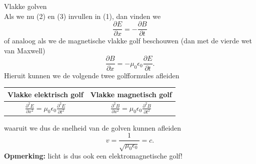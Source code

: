 \begin{app}{Vlakke golven}
\begin{equation}
    \end{equation}
    Als we nu (2) en (3) invullen in (1), dan vinden we
    \begin{equation*}
        \frac{\partial E}{\partial x} = - \frac{\partial B}{\partial t}
    \end{equation*}
    of analoog als we de magnetische vlakke golf beschouwen (dan met de vierde wet van Maxwell)
    \begin{equation*}
        \frac{\partial B}{\partial x} = - \mu_0\epsilon_0 \frac{\partial E}{\partial t}.
    \end{equation*}
    Hieruit kunnen we de volgende twee golfformules afleiden
    \begin{center}
        \def\arraystretch{2}
        \begin{tabular}{c|c}
            Vlakke elektrisch golf & Vlakke magnetisch golf \\ \hline
            $\frac{\partial^2 E}{\partial x^2} = \mu_0\epsilon_0 \frac{\partial^2 E}{\partial t^2} $ & $\frac{\partial^2 B}{\partial x^2} = \mu_0\epsilon_0 \frac{\partial^2 B}{\partial t^2}$ 
        \end{tabular}
    \end{center}
    waaruit we dus de snelheid van de golven kunnen afleiden
    \begin{equation*}
        v = \frac{1}{\sqrt{\mu_0\epsilon_0}} = c.
    \end{equation*}
    \vspace{0.3cm}
    \textbf{Opmerking:} licht is dus ook een elektromagnetische golf!
\end{app}

\newpage

